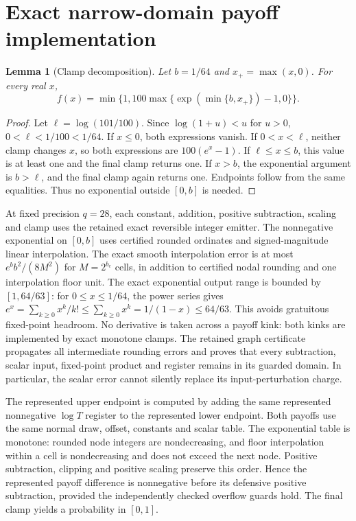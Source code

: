 \documentclass[11pt]{article}
\newtheorem{lemma}[theorem]{Lemma}
\begin{document}
\section{Exact narrow-domain payoff implementation}

\begin{lemma}[Clamp decomposition]\label{lem:raw-clamp}
Let $b=1/64$ and $x_+=\max(x,0)$. For every real $x$,
\begin{equation}
 f(x)=\min\{1,100\max\{\exp(\min\{b,x_+\})-1,0\}\}.
\end{equation}
\end{lemma}
\begin{proof}
Let $\ell=\log(101/100)$. Since $\log(1+u)<u$ for $u>0$,
$0<\ell<1/100<1/64$. If $x\leq0$, both expressions vanish.
If $0<x<\ell$, neither clamp changes $x$, so both expressions are
$100(e^x-1)$. If $\ell\leq x\leq b$, this value is at least one
and the final clamp returns one. If $x>b$, the exponential argument
is $b>\ell$, and the final clamp again returns one. Endpoints follow
from the same equalities. Thus no exponential outside $[0,b]$ is needed.
\end{proof}

At fixed precision $q=28$, each constant, addition, positive subtraction,
scaling and clamp uses the retained exact reversible integer emitter.
The nonnegative exponential on $[0,b]$ uses certified rounded ordinates
and signed-magnitude linear interpolation. The exact smooth interpolation
error is at most $e^b b^2/(8M^2)$ for $M=2^{b_e}$ cells, in addition
to certified nodal rounding and one interpolation floor unit.
The exact exponential output range is bounded by $[1,64/63]$:
for $0\leq x\leq1/64$, the power series gives
$e^x=\sum_{k\geq0}x^k/k!\leq\sum_{k\geq0}x^k=1/(1-x)\leq64/63$.
This avoids gratuitous fixed-point headroom.
No derivative is taken across a payoff kink: both kinks are implemented
by exact monotone clamps. The retained graph certificate propagates
all intermediate rounding errors and proves that every subtraction,
scalar input, fixed-point product and register remains in its guarded
domain. In particular, the scalar error cannot silently replace its
input-perturbation charge.

The represented upper endpoint is computed by adding the same represented
nonnegative $\log T$ register to the represented lower endpoint. Both
payoffs use the same normal draw, offset, constants and scalar table.
The exponential table is monotone: rounded node integers are nondecreasing,
and floor interpolation within a cell is nondecreasing and does not exceed
the next node. Positive subtraction, clipping and positive scaling preserve
this order. Hence the represented payoff difference is nonnegative before
its defensive positive subtraction, provided the independently checked
overflow guards hold. The final clamp yields a probability in $[0,1]$.
\end{document}
